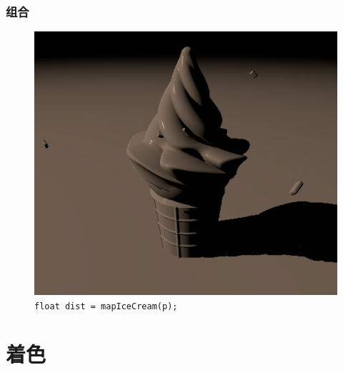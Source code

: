 \documentclass[aspectratio=169]{ctexbeamer} %
\begin{document}
\begin{frame}
    \frametitle{组合}
    \begin{figure}[htbp]
        \centering
        \includegraphics[height=.75\textheight]{images/pre/icecream_model.pdf}
        \caption{\texttt{float dist = mapIceCream(p);}}
        \label{fig:icecream_model}
    \end{figure}
\end{frame}

\section{着色}
\end{document}
